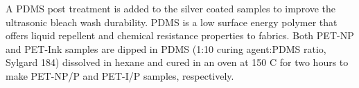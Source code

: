 \documentclass[10pt,letterpaper]{article}
\begin{document}



  


A PDMS post treatment is added to the silver coated samples to improve the ultrasonic bleach wash durability. PDMS is a low surface energy polymer that offers liquid repellent and chemical resistance properties to fabrics.\cite{ye_2018} 
Both PET-NP and PET-Ink samples are dipped in PDMS (1:10 curing agent:PDMS ratio, Sylgard 184) dissolved in hexane and cured in an oven at 150 \degree C for two hours to make PET-NP/P and PET-I/P samples, respectively. 
\end{document}
